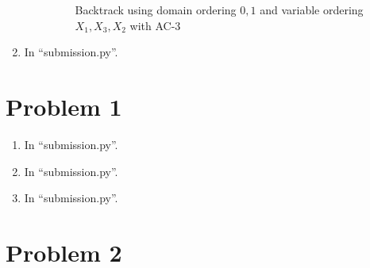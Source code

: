 \documentclass[12pt]{article}
\begin{document}
\begin{enumerate}[label=(\alph*)]
\begin{enumerate}[label=\roman*]
\begin{figure}[!h]
          \caption{Backtrack using domain ordering ${0,1}$ and variable ordering ${X_1, X_3, X_2}$ with AC-3}
          \label{fig:backtrack_ac3}
        \end{figure}
    \end{enumerate}
    \item In ``submission.py''.
\end{enumerate}

\section*{Problem 1}

\begin{enumerate}[label=(\alph*)]
  \item In ``submission.py''.
  \item In ``submission.py''.
  \item In ``submission.py''.
\end{enumerate}

\section*{Problem 2}
\end{document}
